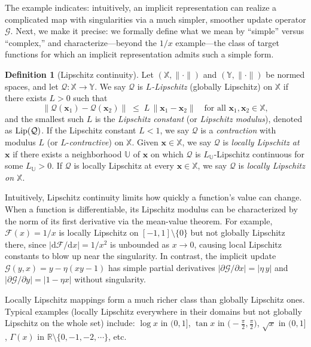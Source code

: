 \documentclass{amsart} %
\def\vx{{\bm{x}}}
\def\sR{{\mathbb{R}}}
\def\sU{{\mathbb{U}}}
\def\sX{{\mathbb{X}}}
\def\sY{{\mathbb{Y}}}
\def\cF{{\mathcal{F}}}
\def\cG{{\mathcal{G}}}
\def\cQ{{\mathcal{Q}}}
\theoremstyle{definition}
\newtheorem{definition}[theorem]{Definition}
\theoremstyle{remark}
\begin{document}
The example indicates: intuitively, an implicit representation can realize a complicated map with singularities via a much simpler, smoother update operator \(\cG\). Next, we make it precise: we formally define what we mean by “simple” versus “complex,” and characterize—beyond the \(1/x\) example—the class of target functions for which an implicit representation admits such a simple form.

\begin{definition}[Lipschitz continuity]
\label{def:lip}
Let $(\sX,\|\cdot\|)$ and $(\sY,\|\cdot\|)$ be normed spaces, and let $\cQ:\sX\to\sY$.
We say $\cQ$ is \emph{$L$-Lipschitz} (globally Lipschitz) on $\sX$ if there exists $L>0$ such that
\[
\|\cQ(\vx_1)-\cQ(\vx_2)\| \;\le\; L\,\|\vx_1-\vx_2\|\quad\text{for all }\vx_1,\vx_2\in\sX,
\]
and the smallest such $L$ is the \emph{Lipschitz constant} (or \emph{Lipschitz modulus}), denoted as $\textup{Lip}(\cQ)$. If the Lipschitz constant $L < 1$, we say $\cQ$ is a \textit{contraction} with modulus $L$ (or $L$-\textit{contractive}) on $\sX$. 
Given $\vx\in\sX$, we say $\cQ$ is \emph{locally Lipschitz at $\vx$} if there exists a neighborhood $\sU$ of $\vx$ on which $\cQ$ is $L_\sU$-Lipschitz continuous for some $L_\sU>0$.
If $\cQ$ is locally Lipschitz at every $\vx\in\sX$, we say $\cQ$ is \emph{locally Lipschitz on $\sX$}.
\end{definition}





Intuitively, Lipschitz continuity limits how quickly a function’s value can change. When a function is differentiable, its Lipschitz modulus can be characterized by the norm of its first derivative via the mean-value theorem. For example, \(\cF(x)=1/x\) is locally Lipschitz on \([-1,1]\setminus\{0\}\) but not globally Lipschitz there, since \(|\mathrm{d}\cF/\mathrm{d}x|=1/x^2\) is unbounded as \(x\to 0\), causing local Lipschitz constants to blow up near the singularity. In contrast, the implicit update \(\cG(y,x)=y-\eta(xy-1)\) has simple partial derivatives \(|\partial\cG/\partial x|=|\eta\,y|\) and \(|\partial\cG/\partial y|=|1-\eta x|\) without singularity.


Locally Lipschitz mappings form a much richer class than globally Lipschitz ones. Typical examples (locally Lipschitz everywhere in their domains but not globally Lipschitz on the whole set) include: $\log x$ in $(0,1]$, $\tan x$ in $\bigl(-\tfrac{\pi}{2},\tfrac{\pi}{2}\bigr)$, $\sqrt{x}$ in $(0,1]$, $\Gamma(x)$ in $\sR \setminus \{0, -1, -2,\cdots\}$, etc.
\end{document}

